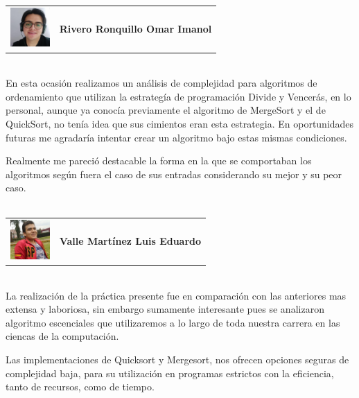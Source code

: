 \begin{tabular}{l l}
        \multirow{3}{*}{\includegraphics[width=1.5cm]{Imagenes/imanol.jpg}} &  \\
        & \textbf{Rivero Ronquillo Omar Imanol}\\
        & \\
    \end{tabular}
    \vspace*{3\baselineskip}\\
    En esta ocasión realizamos un análisis de complejidad para algoritmos de ordenamiento que utilizan la estrategía de programación Divide y Vencerás, en lo personal, aunque ya conocía previamente el algoritmo de MergeSort y el de QuickSort, no tenía idea que sus cimientos eran esta estrategia. En oportunidades futuras me agradaría intentar crear un algoritmo bajo estas mismas condiciones. 
    
    Realmente me pareció destacable la forma en la que se comportaban los algoritmos según fuera el caso de sus entradas considerando su mejor y su peor caso.
    \\\\
    \begin{tabular}{l l}
        \multirow{3}{*}{\includegraphics[width=1.5cm]{Imagenes/lalo.jpg}}  &  \\
        & \textbf{Valle Mart\'inez Luis Eduardo} \\
        & \\
    \end{tabular}
    \vspace*{3\baselineskip}\\
    La realización de la práctica presente fue en comparación con las anteriores mas extensa y laboriosa, sin embargo sumamente interesante pues se analizaron algoritmo escenciales que utilizaremos a lo largo de toda nuestra carrera en las ciencas de la computación.
    
    Las implementaciones de Quicksort y Mergesort, nos ofrecen opciones seguras de complejidad baja, para su utilización en programas estrictos con la eficiencia, tanto de recursos, como de tiempo.
    
